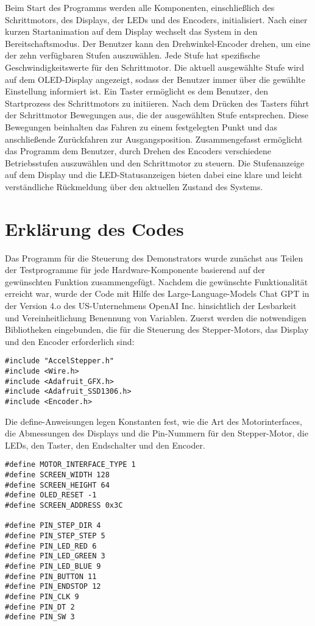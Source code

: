 Beim Start des Programms werden alle Komponenten, einschließlich des Schrittmotors, des Displays, der LEDs und des Encoders, initialisiert. Nach einer kurzen Startanimation auf dem Display wechselt das System in den Bereitschaftsmodus.
Der Benutzer kann den Drehwinkel-Encoder drehen, um eine der zehn verfügbaren Stufen auszuwählen. Jede Stufe hat spezifische Geschwindigkeitswerte für den Schrittmotor. Die aktuell ausgewählte Stufe wird auf dem OLED-Display angezeigt, sodass der Benutzer immer über die gewählte Einstellung informiert ist.
Ein Taster ermöglicht es dem Benutzer, den Startprozess des Schrittmotors zu initiieren. Nach dem Drücken des Tasters führt der Schrittmotor Bewegungen aus, die der ausgewählten Stufe entsprechen. Diese Bewegungen beinhalten das Fahren zu einem festgelegten Punkt und das anschließende Zurückfahren zur Ausgangsposition.
Zusammengefasst ermöglicht das Programm dem Benutzer, durch Drehen des Encoders verschiedene Betriebsstufen auszuwählen und den Schrittmotor zu steuern. Die Stufenanzeige auf dem Display und die LED-Statusanzeigen bieten dabei eine klare und leicht verständliche Rückmeldung über den aktuellen Zustand des Systems.

\section{Erklärung des Codes}

Das Programm für die Steuerung des Demonstrators wurde zunächst aus Teilen der Testprogramme für jede Hardware-Komponente basierend auf der gewünschten Funktion zusammengefügt. Nachdem die gewünschte Funktionalität erreicht war, wurde der Code mit Hilfe des Large-Language-Models Chat GPT in der Version 4.o des US-Unternehmens OpenAI Inc. hinsichtlich der Lesbarkeit und Vereinheitlichung Benennung von Variablen.
Zuerst werden die notwendigen Bibliotheken eingebunden, die für die Steuerung des Stepper-Motors, das Display und den Encoder erforderlich sind:

\begin{lstlisting}
#include "AccelStepper.h"
#include <Wire.h>
#include <Adafruit_GFX.h>
#include <Adafruit_SSD1306.h>
#include <Encoder.h>
\end{lstlisting}

Die define-Anweisungen legen Konstanten fest, wie die Art des Motorinterfaces, die Abmessungen des Displays und die Pin-Nummern für den Stepper-Motor, die LEDs, den Taster, den Endschalter und den Encoder.

\begin{lstlisting}
#define MOTOR_INTERFACE_TYPE 1
#define SCREEN_WIDTH 128
#define SCREEN_HEIGHT 64
#define OLED_RESET -1
#define SCREEN_ADDRESS 0x3C

#define PIN_STEP_DIR 4
#define PIN_STEP_STEP 5
#define PIN_LED_RED 6
#define PIN_LED_GREEN 3
#define PIN_LED_BLUE 9
#define PIN_BUTTON 11
#define PIN_ENDSTOP 12
#define PIN_CLK 9
#define PIN_DT 2
#define PIN_SW 3
\end{lstlisting}

